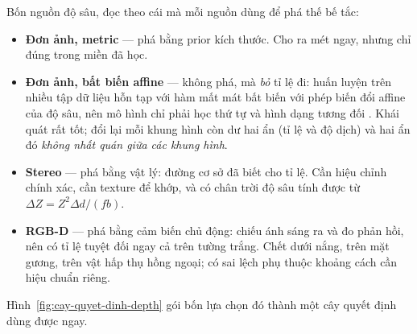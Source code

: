 \documentclass[../../../deep_learning.tex]{subfiles}
\begin{document}
Bốn nguồn độ sâu, đọc theo cái mà mỗi nguồn dùng để phá thế bế tắc:
\begin{itemize}
\item \textbf{Đơn ảnh, metric} --- phá bằng prior kích thước. Cho ra mét ngay, nhưng chỉ đúng trong miền đã học.
\item \textbf{Đơn ảnh, bất biến affine} --- không phá, mà \emph{bỏ} tỉ lệ đi: huấn luyện trên nhiều tập dữ liệu hỗn tạp với hàm mất mát bất biến với phép biến đổi affine của độ sâu, nên mô hình chỉ phải học thứ tự và hình dạng tương đối \cite{eigen2014depth,ranftl2022midas}. Khái quát rất tốt; đổi lại mỗi khung hình còn dư hai ẩn (tỉ lệ và độ dịch) và hai ẩn đó \emph{không nhất quán giữa các khung hình}.
\item \textbf{Stereo} --- phá bằng vật lý: đường cơ sở đã biết cho tỉ lệ. Cần hiệu chỉnh chính xác, cần texture để khớp, và có chân trời độ sâu tính được từ \(\Delta Z = Z^{2}\Delta d/(fb)\).
\item \textbf{RGB-D} --- phá bằng cảm biến chủ động: chiếu ánh sáng ra và đo phản hồi, nên có tỉ lệ tuyệt đối ngay cả trên tường trắng. Chết dưới nắng, trên mặt gương, trên vật hấp thụ hồng ngoại; có sai lệch phụ thuộc khoảng cách cần hiệu chuẩn riêng.
\end{itemize}

Hình~\ref{fig:cay-quyet-dinh-depth} gói bốn lựa chọn đó thành một cây quyết định dùng được ngay.
\end{document}
